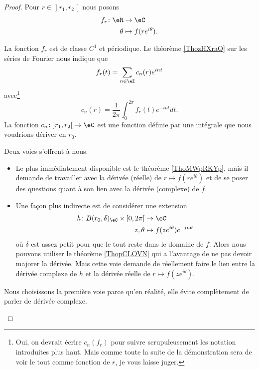 \begin{proof}
	Pour \( r\in\mathopen] r_1 , r_2 \mathclose[\) nous posons
	\begin{equation}
		\begin{aligned}
			f_r\colon \eR & \to \eC                   \\
			\theta        & \mapsto f(r e^{i\theta}).
		\end{aligned}
	\end{equation}
	\begin{subproof}
		\item[Coefficients de Fourier]
		La fonction \( f_r\) est de classe \( C^1\) et périodique. Le théorème \ref{ThozHXraQ} sur les séries de Fourier nous indique que
		\begin{equation}      \label{EQooIHQRooZWqJKL}
			f_r(t)=\sum_{n\in \eZ}c_n(r) e^{int}
		\end{equation}
		avec\footnote{Oui, on devrait écrire \( c_n(f_r)\) pour suivre scrupuleusement les notation introduites plus haut. Mais comme toute la suite de la démonstration sera de voir le tout comme fonction de \( r\), je vous laisse juger.}
		\begin{equation}
			c_n(r)=\frac{1}{ 2\pi }\int_0^{2\pi}f_r(t) e^{-int}dt.
		\end{equation}
		La fonction \( c_n\colon \mathopen] r_1 , r_2 \mathclose[\to \eC\) est une fonction définie par une intégrale que nous voudrions dériver en \( r_0\).
			\item[Digression]
			Deux voies s'offrent à nous.
			\begin{itemize}
				\item Le plus immédiatement disponible est le théorème \ref{ThoMWpRKYp}, mais il demande de travailler avec la dérivée (réelle) de \( r\mapsto f(r e^{i\theta})\) et de se poser des questions quant à son lien avec la dérivée (complexe) de \( f\).
				\item Une façon plus indirecte est de considérer une extension
				      \begin{equation}
					      \begin{aligned}
						      h\colon B(r_0,\delta)_{\eC}\times \mathopen[ 0 , 2\pi \mathclose[ & \to \eC                                \\
						      z,\theta                                                          & \mapsto f(z e^{i\theta}) e^{-in\theta}
					      \end{aligned}
				      \end{equation}
				      où \( \delta\) est assez petit pour que le tout reste dans le domaine de \( f\). Alors nous pouvons utiliser le théorème \ref{ThopCLOVN} qui a l'avantage de ne pas devoir majorer la dérivée. Mais cette voie demande de réellement faire le lien entre la dérivée complexe de \( h\) et la dérivée réelle de \( r\mapsto f(z e^{i\theta})\).
			\end{itemize}
			Nous choisissons la première voie parce qu'en réalité, elle évite complètement de parler de dérivée complexe.


\end{subproof}
\end{proof}

